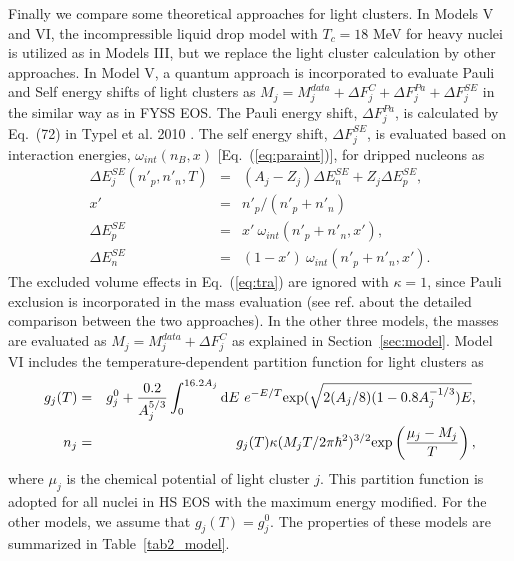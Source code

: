 \documentclass[preprint]{revtex4}
\begin{document}
{{{%
Finally we compare some theoretical approaches for light clusters. 
In Models V and VI, the incompressible liquid drop model with $T_c=18$ MeV for heavy nuclei is utilized as in Models III, but we replace the light cluster calculation %
 by other approaches.  
In Model V, a quantum approach is incorporated to evaluate Pauli and Self energy shifts of  light clusters \cite{roepke09,typel10} as  $ M_{j}=M_j^{data}  +\Delta F_j^C+ \Delta F_{j}^{Pa}  + \Delta F_j^{SE}$ in the similar way as in FYSS EOS. %
The Pauli energy shift, $\Delta F_{j}^{Pa}$, is calculated by Eq.~(72) in Typel et al. 2010 \cite{typel10}.  
The self energy shift, $\Delta F_{j}^{SE}$, is evaluated based on interaction energies, $\omega_{int}(n_B,x)$ [Eq.~(\ref{eq:paraint})], for dripped nucleons as 
\begin{eqnarray}
\label{SE}
\Delta E_{j}^{SE}(n'_{p},n'_{n},T) &=& (A_j-Z_j) \Delta E_{n}^{SE}+ Z_j \Delta E_{p}^{SE},  \\
x'&=&n'_p/(n'_{p}+n'_{n}) \\
\Delta E^{SE}_{p}&=&x' \ \omega_{int}(n'_{p}+n'_{n},x') , \\
\Delta E^{SE}_{n}&=&(1-x') \ \omega_{int}(n'_{p}+n'_{n},x') .
\end{eqnarray}
The excluded volume effects in Eq.~(\ref{eq:tra}) are ignored with $\kappa=1$, since Pauli exclusion  is incorporated in the mass evaluation (see ref. \cite{hempel11} about the detailed comparison between  the two approaches).
In the other three models, the masses are evaluated as $ M_{j}=M_j^{data}  +\Delta F_j^C$ as explained in Section~\ref{sec:model}.
Model VI includes the temperature-dependent partition function for light clusters as 
\begin{eqnarray} %
\label{eq:lv}
g_{j}(T) &=& g_j^0 + \frac{0.2}{A_j^{5/3}} \int_0^{16.2A_j} {\rm d} E \ e^{-E/T}  {\rm exp} (\sqrt{2(A_j/8)(1-0.8A_j^{-1/3}) E} , \\
n_j &=& g_j (T) \kappa (M_{j} T/2 \pi \hbar^2 )^{3/2}  {\rm exp} \left( \frac{\mu_j-M_j}{T} \right),
\end{eqnarray}
where $\mu_j$ is  the chemical potential of light cluster $j$. %
This partition function \cite{fai82}  is adopted for all nuclei in HS EOS with the maximum energy modified. %
For the other models, we assume that $g_j(T)=g_j^0$.
The properties of these models are summarized in Table~\ref{tab2_model}.}

}}
\end{document}

